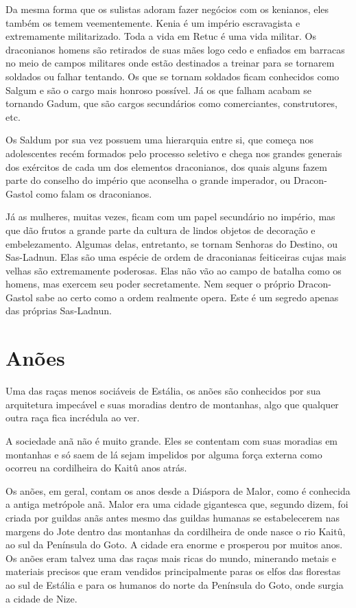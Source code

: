 \begin{multicols}{2}
Da mesma forma que os sulistas adoram fazer negócios com os kenianos, eles
também os temem veementemente. Kenia é um império escravagista e extremamente
militarizado. Toda a vida em Retuc é uma vida militar. Os draconianos homens são
retirados de suas mães logo cedo e enfiados em barracas no meio de campos
militares onde estão destinados a treinar para se tornarem soldados ou falhar
tentando. Os que se tornam soldados ficam conhecidos como Salgum e são o cargo
mais honroso possível. Já os que falham acabam se tornando Gadum, que são cargos
secundários como comerciantes, construtores, etc.

Os Saldum por sua vez possuem uma hierarquia entre si, que começa nos
adolescentes recém formados pelo processo seletivo e chega nos grandes generais
dos exércitos de cada um dos elementos draconianos, dos quais alguns fazem parte
do conselho do império que aconselha o grande imperador, ou Dracon-Gastol como
falam os draconianos.

Já as mulheres, muitas vezes, ficam com um papel secundário no império, mas que
dão frutos a grande parte da cultura de lindos objetos de decoração e
embelezamento. Algumas delas, entretanto, se tornam Senhoras do Destino, ou
Sas-Ladnun. Elas são uma espécie de ordem de draconianas feiticeiras cujas mais
velhas são extremamente poderosas. Elas não vão ao campo de batalha como os
homens, mas exercem seu poder secretamente. Nem sequer o próprio Dracon-Gastol
sabe ao certo como a ordem realmente opera. Este é um segredo apenas das
próprias Sas-Ladnun.

\section{Anões}%

Uma das raças menos sociáveis de Estália, os anões são conhecidos por sua
arquitetura impecável e suas moradias dentro de montanhas, algo que qualquer
outra raça fica incrédula ao ver.

A sociedade anã não é muito grande. Eles se contentam com suas moradias em
montanhas e só saem de lá sejam impelidos por alguma força externa como ocorreu
na cordilheira do Kaitû anos atrás.

Os anões, em geral, contam os anos desde a Diáspora de Malor, como é conhecida a
antiga metrópole anã. Malor era uma cidade gigantesca que, segundo dizem, foi
criada por guildas anãs antes mesmo das guildas humanas se estabelecerem nas
margens do Jote dentro das montanhas da cordilheira de onde nasce o rio Kaitû,
ao sul da Península do Goto. A cidade era enorme e prosperou por muitos anos. Os
anões eram talvez uma das raças mais ricas do mundo, minerando metais e
materiais precisos que eram vendidos principalmente paras os elfos das florestas
ao sul de Estália e para os humanos do norte da Península do Goto, onde surgia a
cidade de Nize.


\end{multicols}
